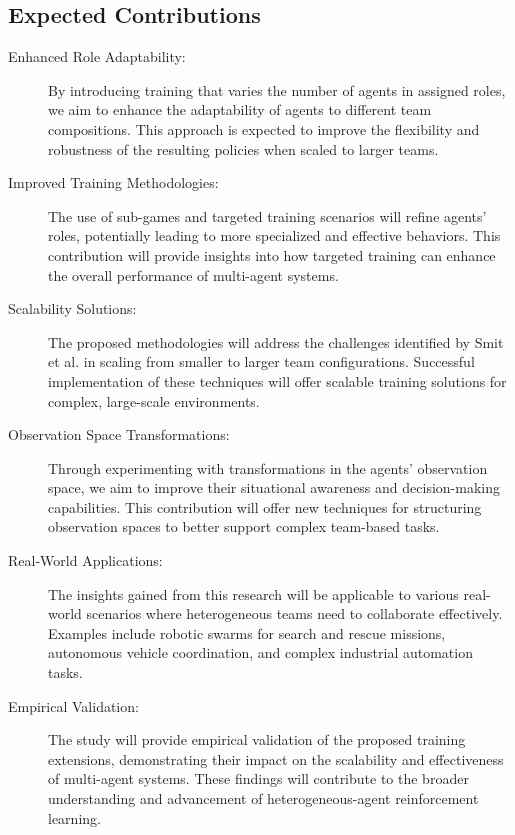 \subsection{Expected Contributions}
\begin{description}
    \item[Enhanced Role Adaptability:] 
    By introducing training that varies the number of agents in assigned roles, 
    we aim to enhance the adaptability of agents to different team compositions. 
    This approach is expected to improve the flexibility and robustness of the resulting 
    policies when scaled to larger teams.
    \item[Improved Training Methodologies:] 
    The use of sub-games and targeted training scenarios will refine agents' roles, 
    potentially leading to more specialized and effective behaviors. 
    This contribution will provide insights into how targeted training can enhance the 
    overall performance of multi-agent systems.
    \item[Scalability Solutions:] 
    The proposed methodologies will address the challenges identified by Smit et al. 
    in scaling from smaller to larger team configurations. Successful implementation of these 
    techniques will offer scalable training solutions for complex, large-scale environments.
    \item[Observation Space Transformations:] 
    Through experimenting with transformations in the agents' observation space,
    we aim to improve their situational awareness and decision-making capabilities. 
    This contribution will offer new techniques for structuring observation spaces to 
    better support complex team-based tasks.
    \item[Real-World Applications:] 
    The insights gained from this research will be applicable to various real-world scenarios 
    where heterogeneous teams need to collaborate effectively. 
    Examples include robotic swarms for search and rescue missions, 
    autonomous vehicle coordination, and complex industrial automation tasks.
    \item[Empirical Validation:] 
    The study will provide empirical validation of the proposed training extensions, 
    demonstrating their impact on the scalability and effectiveness of multi-agent systems. 
    These findings will contribute to the broader understanding and advancement of 
    heterogeneous-agent reinforcement learning.
\end{description}


